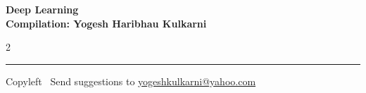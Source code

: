 \documentclass[8pt,landscape]{article}
\begin{document}
\footnotesize


\begin{center}
\Large{\textbf{Deep Learning\\ Compilation: Yogesh Haribhau Kulkarni}}  
\end{center}

\begin{multicols}{2}

\end{multicols}

\rule{\linewidth}{0.25pt}
\scriptsize
Copyleft \textcopyleft\  Send suggestions to 
\href{http://www.yogeshkulkarni.com}{yogeshkulkarni@yahoo.com}
\end{document}
